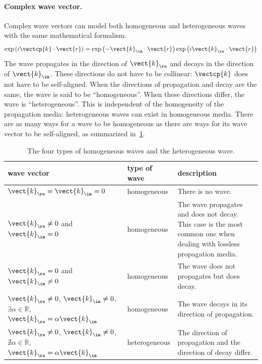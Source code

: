\paragraph{Complex wave vector.}
\label{sec:complex_wave_vector}
Complex wave vectors can model both homogeneous and heterogeneous waves with the same mathematical formalism.
\begin{equation}
    \exp \left( i \vectcp{k} \cdot \vect{r} \right)
    =
    \exp \left( - \vect{k}_\im \cdot \vect{r} \right)
    \exp \left( i \vect{k}_\re \cdot \vect{r} \right)
\end{equation}
The wave propagates in the direction of $\vect{k}_\re$
and decays in the direction of $\vect{k}_\im$.
These directions do not have to be collinear: $\vectcp{k}$ does not have to be self-aligned.
When the directions of propagation and decay are the same, the wave is said to be ``homogeneous''.
When these directions differ, the wave is ``heterogeneous''.
This is independent of the homogeneity of the propagation media: heterogeneous waves can exist in homogeneous media.
There are as many ways for a wave to be homogeneous as there are ways for its wave vector to be self-aligned, as summarized in~\cref{tab:types_homo_hetero_waves}.
\begin{table}[hbtp]
    \centering
    \begin{tabularx}{\textwidth}{p{3cm}lX}
        \toprule
        wave vector & type of wave & description\\
        \midrule
                $\vect{k}_\re = \vect{k}_\im = 0$
                &
                homogeneous
                &
                There is no wave.
            \\
                $\vect{k}_\re \neq 0$ and $\vect{k}_\im = 0$
                &
                homogeneous
                &
                The wave propagates and does not decay.
                This case is the most common one when dealing with
                lossless propagation media.
            \\
                $\vect{k}_\re = 0$ and $\vect{k}_\im \neq 0$
                &
                homogeneous
                &
                The wave does not propagates but does decay.
            \\
                $\vect{k}_\re \neq 0$, $\vect{k}_\im \neq 0$, $\exists \alpha \in \mathbb{R}$, $\vect{k}_\re = \alpha \vect{k}_\im$
                &
                homogeneous
                &
                The wave decays in its direction of propagation.
            \\
                $\vect{k}_\re \neq 0$, $\vect{k}_\im \neq 0$, $\nexists \alpha \in \mathbb{R}$, $\vect{k}_\re = \alpha \vect{k}_\im$
                &
                heterogeneous
                &
                The direction of propagation and the direction of decay differ.
            \\
        \bottomrule
    \end{tabularx}
    \caption{The four types of homogeneous waves and the heterogeneous wave.}
    \label{tab:types_homo_hetero_waves}
\end{table}

